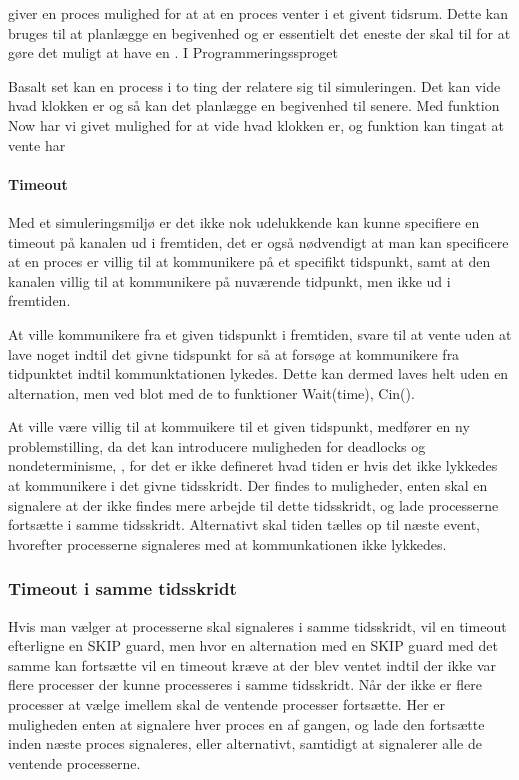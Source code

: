  giver en proces mulighed for at at en proces venter i et givent
tidsrum. Dette kan bruges til at planlægge en begivenhed og er
essentielt det eneste der skal til for at gøre det muligt at have en
\des. I Programmeringssproget \simpy


Basalt set kan en process i \des to ting der relatere sig til
simuleringen. Det kan vide hvad klokken er og så kan det planlægge en
begivenhed til senere. Med funktion Now har vi givet mulighed for at
vide hvad klokken er, og funktion kan tingat at vente har



\paragraph*{Timeout} Med et simuleringsmiljø er det ikke nok
udelukkende kan kunne specifiere en timeout på kanalen ud i fremtiden,
det er også nødvendigt at man kan specificere at en proces er villig
til at kommunikere på et specifikt tidspunkt, samt at den kanalen
villig til at kommunikere på nuværende tidpunkt, men ikke ud i
fremtiden.

At ville kommunikere fra et given tidspunkt i fremtiden, svare til at   
vente uden at lave noget indtil det givne tidspunkt for så at forsøge 
at kommunikere fra tidpunktet indtil kommunktationen lykedes. Dette     
kan dermed laves helt uden en alternation, men ved blot med de to       
funktioner Wait(time), Cin().                                           

At ville være villig til at kommuikere til et given tidspunkt,         
medfører en ny problemstilling, da det kan introducere muligheden      
for deadlocks og nondeterminisme, , for det     
er ikke defineret hvad tiden er hvis det ikke lykkedes at kommunikere   
i det givne tidsskridt. Der findes to muligheder, enten skal \sched     
en signalere at der ikke findes mere arbejde til dette tidsskridt, og   
lade processerne fortsætte i samme tidsskridt. Alternativt skal tiden  
tælles op til næste event, hvorefter processerne signaleres med at    
kommunkationen ikke lykkedes.                                           

\subsubsection{Timeout i samme tidsskridt} Hvis man vælger at
processerne skal signaleres i samme tidsskridt, vil en timeout
efterligne en SKIP guard, men hvor en alternation med en SKIP guard med
det samme kan fortsætte vil en timeout kræve at der blev ventet indtil
der ikke var flere processer der kunne processeres i samme tidsskridt.
Når der ikke er flere processer at vælge imellem skal de ventende
processer fortsætte. Her er muligheden enten at signalere hver proces
en af gangen, og lade den fortsætte inden næste proces signaleres,
eller alternativt, samtidigt at signalerer alle de ventende processerne.

